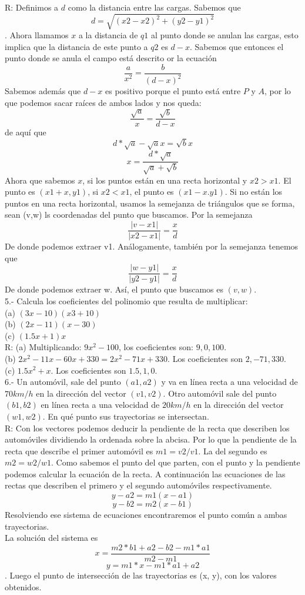 \documentclass{article}
\begin{document}
R: Definimos a $d$ como la distancia entre las cargas. Sabemos que \[ d = \sqrt{(x2-x2)^2 + (y2-y1)^2} \]. Ahora llamamos $x$ a la distancia de $q1$ al punto donde se anulan las cargas, esto implica que la distancia de este punto a $q2$ es $d - x$. Sabemos que entonces el punto donde se anula el campo está descrito or la ecuación \[ \frac{a}{x^2} = \frac{b}{(d-x)^2}\] Sabemos además que $d-x$ es positivo porque el punto está entre $P$ y $A$, por lo que podemos sacar raíces de ambos lados y nos queda:  \[ \frac{\sqrt{a}}{x} = \frac{\sqrt{b}}{d-x}\] de aquí que \[ d*\sqrt{a} - \sqrt{a}x = \sqrt{b}x \] \[x = \frac{d*\sqrt{a}}{\sqrt{a}+\sqrt{b}}\] Ahora que sabemos $x$, si los puntos están en una recta horizontal y $x2 > x1$. El punto es $(x1+x, y1)$, si $x2 < x1$, el punto es $(x1-x.y1)$. Si no están los puntos en una recta horizontal, usamos la semejanza de triángulos que se forma, sean (v,w) ls coordenadas del punto que buscamos. Por la semejanza \[ \frac{|v-x1|}{|x2-x1|} = \frac{x}{d} \] De donde podemos extraer v1. Análogamente, también por la semejanza tenemos que \[ \frac{|w-y1|}{|y2-y1|} = \frac{x}{d} \] De donde podemos extraer w. Así, el punto que buscamos es $(v,w)$. \\

5.- Calcula los coeficientes del polinomio que resulta de multiplicar:\\
(a) $(3x-10)(x3+10)$\\
(b) $(2x-11)(x-30)$\\
(c) $(1.5x+1)x$\\

R: (a) Multiplicando: $9x^2 - 100$, los coeficientes son: $9, 0, 100$.\\

(b) $2x^2 -11x -60x+ 330 = 2x^2 - 71x + 330$. Los coeficientes son $2, -71, 330$.\\

(c) $1.5x^2 + x$. Los coeficientes son $1.5, 1, 0$.\\ 

6.- Un automóvil, sale del punto $(a1,a2)$ y va en línea recta a una velocidad de $70 km/h$ en la dirección del vector $(v1,v2)$. Otro automóvil sale del punto $(b1,b2)$ en línea recta a una velocidad de $20 km/h$ en la dirección del vector $(w1,w2)$. En qué punto sus trayectorias se intersectan. \\

R: Con los vectores podemos deducir la pendiente de la recta que describen los automóviles dividiendo la ordenada sobre la abcisa. Por lo que la pendiente de la recta que describe el primer automóvil es $m1 = v2/v1$. La del segundo es $m2 = w2/w1$. Como sabemos el punto del que parten, con el punto y la pendiente podemos calcular la ecuación de la recta. A continuación las ecuaciones de las rectas que describen el primero y el segundo automóviles respectivamente. \[ y - a2 = m1(x - a1)\] \[ y - b2 = m2 (x-b1) \] Resolviendo ese sistema de ecuaciones encontraremos el punto común a ambas trayectorias.\\

La solución del sistema es \[x = \frac{m2*b1+a2-b2-m1*a1}{m2-m1}\] \[y = m1*x-m1*a1+a2\]. Luego el punto de intersección de las trayectorias es (x, y), con los valores obtenidos.\\\\
\end{document}
